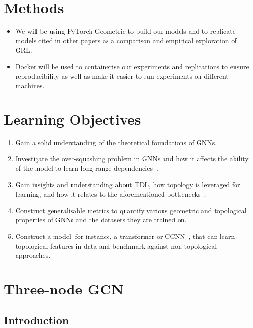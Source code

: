 \documentclass[a4paper,12pt]{article}
\begin{document}
\section{Methods}
\begin{itemize}
	\item  We will be using PyTorch Geometric to build our models and to replicate models cited in other papers as a comparison and empirical exploration of GRL.
	\item Docker will be used to containerise our experiments and replications to ensure reproducibility as well as make it easier to run experiments on different machines.
\end{itemize}

\section{Learning Objectives}


\begin{enumerate}
	\item Gain a solid understanding of the theoretical foundations of GNNs.
	\item Investigate the over-squashing problem in GNNs and how it affects the ability of the model to learn long-range dependencies~\cite{alon_bottleneck_2021}.
	\item Gain insights and understanding about TDL, how topology is leveraged for learning, and how it relates to the aforementioned bottlenecks~\cite{horn_topological_2022}.
	\item Construct generalisable metrics to quantify various geometric and topological properties of GNNs and the datasets they are trained on.
	\item Construct a model, for instance, a transformer or CCNN~\cite{tdlbook}, that can learn topological features in data and benchmark against non-topological approaches.
\end{enumerate}


\section{Three-node GCN}
\subsection{Introduction}
\end{document}
